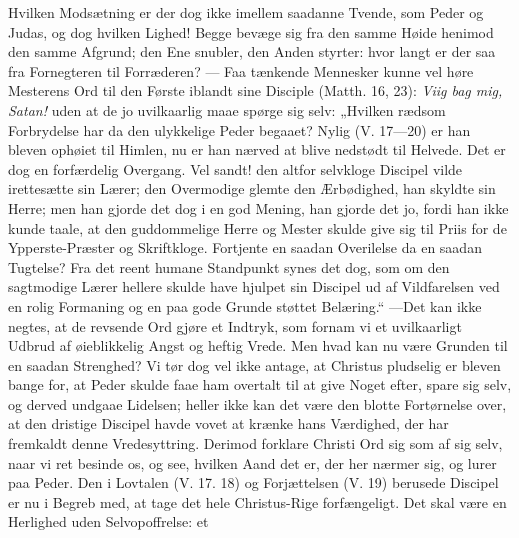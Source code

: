 \documentclass[12pt,a4paper]{book}
\begin{document}
Hvilken Modsætning er der dog ikke imellem saadanne Tvende, som Peder og Judas, og dog
hvilken Lighed! Begge bevæge sig fra den samme Høide henimod den samme Afgrund; den Ene
snubler, den Anden styrter: hvor langt er der saa fra Fornegteren til Forræderen? --- Faa
tænkende Mennesker kunne vel høre Mesterens Ord til den Første iblandt sine Disciple
(Matth. 16, 23): \emph{Viig bag mig, Satan!} uden at de jo uvilkaarlig maae spørge sig
selv: „Hvilken rædsom Forbrydelse har da den ulykkelige Peder begaaet? Nylig
(V. 17---20) er han bleven ophøiet til Himlen, nu er han nærved at blive nedstødt til
Helvede. Det er dog en forfærdelig Overgang. Vel sandt! den altfor selvkloge Discipel
vilde irettesætte sin Lærer; den Overmodige glemte den Ærbødighed, han skyldte sin Herre;
men han gjorde det dog i en god Mening, han gjorde det jo, fordi han ikke kunde taale, at
den guddommelige Herre og Mester skulde give sig til Priis for de Ypperste-Præster og
Skriftkloge. Fortjente en saadan Overilelse da en saadan Tugtelse? Fra det reent humane
Standpunkt synes det dog, som om den sagtmodige Lærer hellere skulde have hjulpet sin
Discipel ud af Vildfarelsen ved en rolig Formaning og
en paa gode Grunde støttet Belæring.“ ---Det kan ikke negtes, at de revsende Ord gjøre et
Indtryk, som fornam vi et uvilkaarligt Udbrud af øieblikkelig Angst og heftig Vrede. Men
hvad kan nu være Grunden til en saadan Strenghed? Vi tør dog vel ikke antage, at Christus
pludselig er bleven bange for, at Peder skulde faae ham overtalt til at give Noget efter,
spare sig selv, og derved undgaae Lidelsen; heller ikke kan det være den blotte
Fortørnelse over, at den dristige Discipel havde vovet at krænke hans Værdighed, der har
fremkaldt denne Vredesyttring. Derimod forklare Christi Ord sig som af sig selv, naar vi
ret besinde os, og see, hvilken Aand det er, der her nærmer sig, og lurer paa Peder. Den i
Lovtalen (V. 17. 18) og Forjættelsen (V. 19) berusede Discipel er nu i Begreb med, at tage
det hele Christus-Rige forfængeligt. Det skal være en Herlighed uden Selvopoffrelse: et
\end{document}
